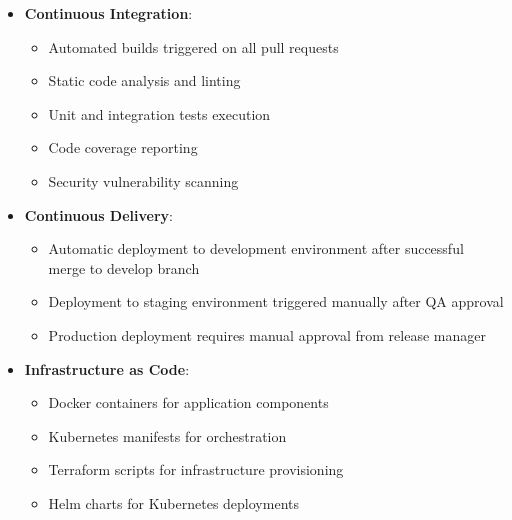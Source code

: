 \begin{itemize}
    \item \textbf{Continuous Integration}:
    \begin{itemize}
        \item Automated builds triggered on all pull requests
        \item Static code analysis and linting
        \item Unit and integration tests execution
        \item Code coverage reporting
        \item Security vulnerability scanning
    \end{itemize}
    
    \item \textbf{Continuous Delivery}:
    \begin{itemize}
        \item Automatic deployment to development environment after successful merge to develop branch
        \item Deployment to staging environment triggered manually after QA approval
        \item Production deployment requires manual approval from release manager
    \end{itemize}
    
    \item \textbf{Infrastructure as Code}:
    \begin{itemize}
        \item Docker containers for application components
        \item Kubernetes manifests for orchestration
        \item Terraform scripts for infrastructure provisioning
        \item Helm charts for Kubernetes deployments
    \end{itemize}
\end{itemize}


